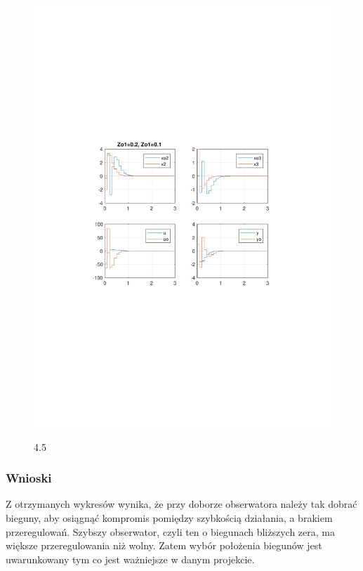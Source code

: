 \documentclass{article}
\begin{document}
\begin{figure}[H]
\includegraphics[clip, trim=2cm 10cm 2cm 9.5cm, width=1.00\textwidth]{../rys/zad4_rys5.pdf}
\label{fig:rys4.5}
\caption{4.5}
\end{figure}
\subsubsection{Wnioski}
Z otrzymanych wykresów wynika, że przy doborze obserwatora należy tak dobrać bieguny, aby osiągnąć kompromis pomiędzy szybkością działania, a brakiem przeregulowań. Szybszy obserwator, czyli ten o biegunach bliższych zera, ma większe przeregulowania niż wolny.
Zatem wybór położenia biegunów jest uwarunkowany tym co jest ważniejsze w danym projekcie.
\end{document}
